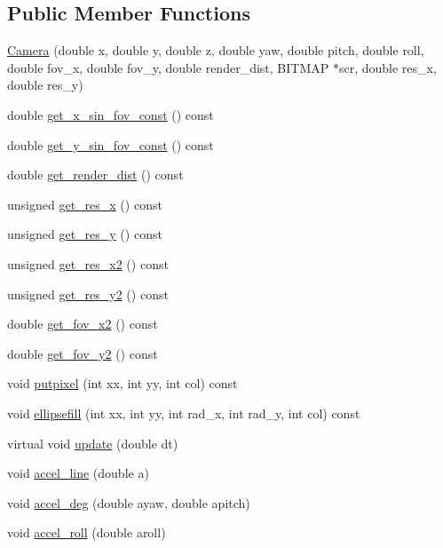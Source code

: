 \subsection*{Public Member Functions}
\begin{DoxyCompactItemize}
\item 
\hyperlink{class_camera_aa4fab6c2c09702f8e70d0688ea90c0ae}{Camera} (double x, double y, double z, double yaw, double pitch, double roll, double fov\+\_\+x, double fov\+\_\+y, double render\+\_\+dist, B\+I\+T\+M\+AP $\ast$scr, double res\+\_\+x, double res\+\_\+y)
\item 
double \hyperlink{class_camera_ad85cea48af89cad24edc3eb2bdcdf7ee}{get\+\_\+x\+\_\+sin\+\_\+fov\+\_\+const} () const 
\item 
double \hyperlink{class_camera_a87266e92e70522c3d0e1c397b4ada1af}{get\+\_\+y\+\_\+sin\+\_\+fov\+\_\+const} () const 
\item 
double \hyperlink{class_camera_a1bda457bae36f6a8d0ecf29bd0ec19a9}{get\+\_\+render\+\_\+dist} () const 
\item 
unsigned \hyperlink{class_camera_a744c0732cff592644a4f0e62654d1d10}{get\+\_\+res\+\_\+x} () const 
\item 
unsigned \hyperlink{class_camera_a7d62c7d80c97dc2e703544e7280a5208}{get\+\_\+res\+\_\+y} () const 
\item 
unsigned \hyperlink{class_camera_aa106361d6bab194723cb746c22df8cbe}{get\+\_\+res\+\_\+x2} () const 
\item 
unsigned \hyperlink{class_camera_af0d5d16f478c68fdc8f3bfda7db0ad72}{get\+\_\+res\+\_\+y2} () const 
\item 
double \hyperlink{class_camera_a3537564f96a44b3480d5581c7fec5576}{get\+\_\+fov\+\_\+x2} () const 
\item 
double \hyperlink{class_camera_a160845f2c2da8ef18459b4fc1d5c3929}{get\+\_\+fov\+\_\+y2} () const 
\item 
void \hyperlink{class_camera_a02a92079d7a27b0801611c280b17002b}{putpixel} (int xx, int yy, int col) const 
\item 
void \hyperlink{class_camera_adfd2ffd6a173e3125a220164687d88b1}{ellipsefill} (int xx, int yy, int rad\+\_\+x, int rad\+\_\+y, int col) const 
\item 
virtual void \hyperlink{class_camera_ab521598bed84988be95a89dfcdd9f1aa}{update} (double dt)
\item 
void \hyperlink{class_camera_aa8322375b803f39cb2071be302de4d6e}{accel\+\_\+line} (double a)
\item 
void \hyperlink{class_camera_a301f57ac80bd72485ba854cc08133a82}{accel\+\_\+deg} (double ayaw, double apitch)
\item 
void \hyperlink{class_camera_a7cdb0dd64bb945b4505bc9e8f3ceb980}{accel\+\_\+roll} (double aroll)
\end{DoxyCompactItemize}
